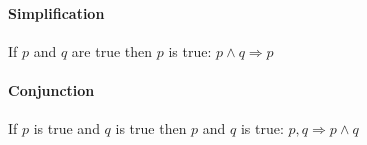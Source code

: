 \paragraph{Simplification} If $p$ and $q$ are true then $p$ is true: $p \wedge q \Rightarrow p$

\paragraph{Conjunction} If $p$ is true and $q$ is true then $p$ and $q$ is true: $p,q \Rightarrow p \wedge q$



